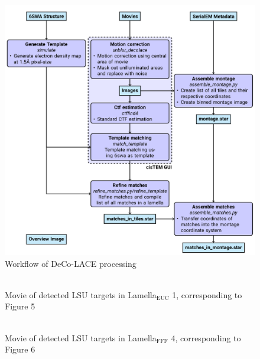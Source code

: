 \documentclass[
]{article}
\newenvironment{fignos:tagged-figure}[1][]{
    \let\oldthefigure\thefigure
    \let\oldtheHfigure\theHfigure
    \renewcommand{\thefigure}{#1}
    \renewcommand{\theHfigure}{#1}
  }{
    \let\thefigure\oldthefigure
    \let\theHfigure\oldtheHfigure
    \addtocounter{figure}{-1}
  }
\begin{document}
\begin{figure}
\hypertarget{fig:deco_lace_workflow}{%
\centering
\includegraphics{figures/deco_lace_workflow.png}
\caption{Workflow of DeCo-LACE processing}\label{fig:deco_lace_workflow}
}
\end{figure}

\begin{fignos:tagged-figure}[Movie 1]

\begin{figure}
\hypertarget{fig:movie1}{%
\centering
\includegraphics{images/1x1-00000000.png}
\caption{Movie of detected LSU targets in Lamella\(_\textrm{EUC}\) 1, corresponding to Figure 5}\label{fig:movie1}
}
\end{figure}

\end{fignos:tagged-figure}

\begin{fignos:tagged-figure}[Movie 2]

\begin{figure}
\hypertarget{fig:movie2}{%
\centering
\includegraphics{images/1x1-00000000.png}
\caption{Movie of detected LSU targets in Lamella\(_\textrm{FFF}\) 4, corresponding to Figure 6}\label{fig:movie2}
}
\end{figure}

\end{fignos:tagged-figure}
\end{document}
